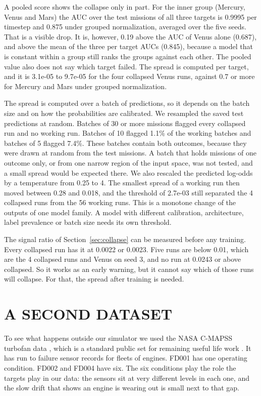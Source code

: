 \documentclass{IEEEtaes}
\begin{document}
A pooled score shows the collapse only in part. For the inner group (Mercury, Venus and Mars) the AUC over the test missions of all three targets is 0.9995 per timestep and 0.875 under grouped normalization, averaged over the five seeds. That is a visible drop. It is, however, 0.19 above the AUC of Venus alone (0.687), and above the mean of the three per target AUCs (0.845), because a model that is constant within a group still ranks the groups against each other. The pooled value also does not say which target failed. The spread is computed per target, and it is 3.1e-05 to 9.7e-05 for the four collapsed Venus runs, against 0.7 or more for Mercury and Mars under grouped normalization.

The spread is computed over a batch of predictions, so it depends on the batch size and on how the probabilities are calibrated. We resampled the saved test predictions at random. Batches of 30 or more missions flagged every collapsed run and no working run. Batches of 10 flagged 1.1\% of the working batches and batches of 5 flagged 7.4\%. These batches contain both outcomes, because they were drawn at random from the test missions. A batch that holds missions of one outcome only, or from one narrow region of the input space, was not tested, and a small spread would be expected there. We also rescaled the predicted log-odds by a temperature from 0.25 to 4. The smallest spread of a working run then moved between 0.28 and 0.018, and the threshold of 2.7e-03 still separated the 4 collapsed runs from the 56 working runs. This is a monotone change of the outputs of one model family. A model with different calibration, architecture, label prevalence or batch size needs its own threshold.

The signal ratio of Section~\ref{sec:collapse} can be measured before any training. Every collapsed run has it at 0.0022 or 0.0023. Five runs are below 0.01, which are the 4 collapsed runs and Venus on seed 3, and no run at 0.0243 or above collapsed. So it works as an early warning, but it cannot say which of those runs will collapse. For that, the spread after training is needed.

\section{A SECOND DATASET}
\label{sec:second}

To see what happens outside our simulator we used the NASA C-MAPSS turbofan data \cite{saxena2008}, which is a standard public set for remaining useful life work \cite{li2018rul}. It has run to failure sensor records for fleets of engines. FD001 has one operating condition. FD002 and FD004 have six. The six conditions play the role the targets play in our data: the sensors sit at very different levels in each one, and the slow drift that shows an engine is wearing out is small next to that gap.
\end{document}
